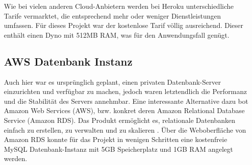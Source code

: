 Wie bei vielen anderen Cloud-Anbietern werden bei Heroku unterschiedliche Tarife vermarktet, die entsprechend mehr oder weniger Dienstleistungen umfassen. Für dieses Projekt war der kostenlose Tarif völlig ausreichend. Dieser enthält einen Dyno mit 512MB RAM, was für den Anwendungsfall genügt.

\subsection{AWS Datenbank Instanz}

Auch hier war es ursprünglich geplant, einen privaten Datenbank-Server einzurichten und verfügbar zu machen, jedoch waren letztendlich die Performanz und die Stabilität des Servers annehmbar. Eine interessante Alternative dazu bot Amazon Web Services (\acs{AWS}), bzw. konkret deren Amazon Relational Database Service (Amazon RDS). Das Produkt ermöglicht es, relationale Datenbanken einfach zu erstellen, zu verwalten und zu skalieren \cite{Gaut2016}. Über die Weboberfläche von Amazon RDS konnte für das Projekt in wenigen Schritten eine kostenfreie MySQL Datenbank-Instanz mit 5GB Speicherplatz und 1GB RAM angelegt werden.

